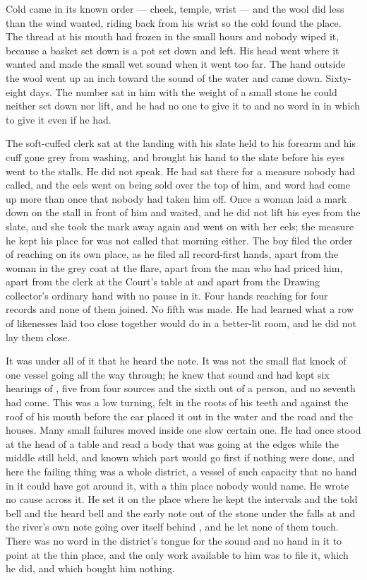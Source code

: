 Cold came in its known order --- cheek, temple, wrist --- and the wool did less than the wind wanted, riding back from his wrist so the cold found the place. The thread at his mouth had frozen in the small hours and nobody wiped it, because a basket set down is a pot set down and left. His head went where it wanted and made the small wet sound when it went too far. The hand outside the wool went up an inch toward the sound of the water and came down. Sixty-eight days. The number sat in him with the weight of a small stone he could neither set down nor lift, and he had no one to give it to and no word in  in which to give it even if he had.

The soft-cuffed clerk sat at the landing with his slate held to his forearm and his cuff gone grey from washing, and brought his hand to the slate before his eyes went to the stalls. He did not speak. He had sat there for a measure nobody had called, and the eels went on being sold over the top of him, and word had come up more than once that nobody had taken him off. Once a woman laid a mark down on the stall in front of him and waited, and he did not lift his eyes from the slate, and she took the mark away again and went on with her eels; the measure he kept his place for was not called that morning either. The boy filed the order of reaching on its own place, as he filed all record-first hands, apart from the woman in the grey coat at the flare, apart from the man who had priced him, apart from the clerk at the Court's table at  and apart from the Drawing collector's ordinary hand with no pause in it. Four hands reaching for four records and none of them joined. No fifth was made. He had learned what a row of likenesses laid too close together would do in a better-lit room, and he did not lay them close.

It was under all of it that he heard the note. It was not the small flat knock of one vessel going all the way through; he knew that sound and had kept six hearings of , five from four sources and the sixth out of a person, and no seventh had come. This was a low turning, felt in the roots of his teeth and against the roof of his mouth before the ear placed it out in the water and the road and the houses. Many small failures moved inside one slow certain one. He had once stood at the head of a table and read a body that was going at the edges while the middle still held, and known which part would go first if nothing were done, and here the failing thing was a whole district, a vessel of such capacity that no hand in it could have got around it, with a thin place nobody would name. He wrote no cause across it. He set it on the place where he kept the intervals and the told bell and the heard bell and the early note out of the stone under the falls at  and the river's own note going over itself behind , and he let none of them touch. There was no word in the district's tongue for the sound and no hand in it to point at the thin place, and the only work available to him was to file it, which he did, and which bought him nothing.

